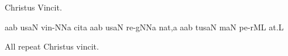 
\beginhymn Christus Vincit.

\smallmusicsize

\def\cantores{\cchar{7}{{\itlyrics Cantors}}}
\def\chorus{\cchar{7}{{\itlyrics All}}}
\def\omnes{\cchar{7}{{\itlyrics All}}}

\Internote
{}
\initiumgregorianum
{}%
\punctum a\spatiumparvum\epiphonus ab\egn
\sgn {}us\clivis aN\egn
\spatium
\sgn v{i}{n-}\punctum N\spatiumparvum\epiphonus Na\egn
\sgn cit\punctum a\egn
\spatium
\divisiominima
\spatium
{}\punctum a\spatiumparvum\epiphonus ab\egn
\sgn {}us\clivis aN\egn
\spatium
\sgn r{e}{-g}\punctum N\spatiumparvum\epiphonus Na\egn
\sgn na{t,}\punctum a\egn
\spatium
\divisiominima
\spatium
{}\punctum a\spatiumparvum\epiphonus ab\egn
\sgn tus\clivis aN\egn
\spatium
\sgn {}{\'\i}m\cephalicus aN\egn
\sgn pe{-r}\clivis ML\egn
\sgn {}a{t.}\punctum L\egn
\spatium
\Finisgregoriana

\bigskip

{\itlyrics All repeat \rm Christus vincit.}

